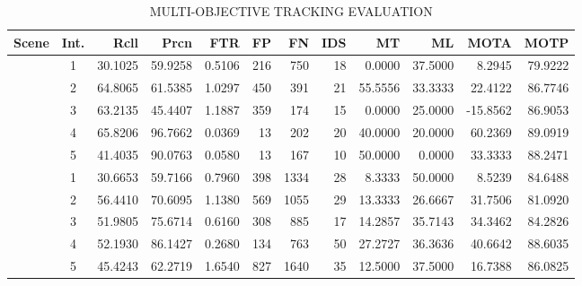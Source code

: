 \documentclass[lettersize,journal]{IEEEtran}
\begin{document}
\begin{table}[t]
	\centering
	\caption{MULTI-OBJECTIVE TRACKING EVALUATION}
	\label{tab:tracking_eval}
	\small
	\begin{tabular}{@{}l@{\hspace{1em}}c@{\hspace{0.5em}}*{10}{r}@{}}
		\toprule
		\textbf{Scene} & \textbf{Int.} & \textbf{Rcll} & \textbf{Prcn} & \textbf{FTR} & \textbf{FP} & \textbf{FN} & \textbf{IDS} & \textbf{MT} & \textbf{ML} & \textbf{MOTA} & \textbf{MOTP} \\
		\midrule
		& 1 & 30.1025 & 59.9258 & 0.5106 & 216 & 750 & 18 & 0.0000 & 37.5000 & 8.2945 & 79.9222\\
		& 2 & 64.8065 & 61.5385 & 1.0297 & 450 & 391 & 21 & 55.5556 & 33.3333 & 22.4122 & 86.7746\\
		& 3 & 63.2135 & 45.4407 & 1.1887 & 359 & 174 & 15 & 0.0000 & 25.0000 & -15.8562 & 86.9053\\
		& 4 & 65.8206 & 96.7662 & 0.0369 & 13 & 202 & 20 & 40.0000 & 20.0000 & 60.2369 & 89.0919\\
		& 5 & 41.4035 & 90.0763 & 0.0580 & 13 & 167 & 10 & 50.0000 & 0.0000 & 33.3333 & 88.2471\\
		\midrule
		& 1 & 30.6653 & 59.7166 & 0.7960 & 398 & 1334 & 28 & 8.3333 & 50.0000 & 8.5239 & 84.6488\\
		& 2 & 56.4410 & 70.6095 & 1.1380 & 569 & 1055 & 29 & 13.3333 & 26.6667 & 31.7506 & 81.0920\\
		& 3 & 51.9805 & 75.6714 & 0.6160 & 308 & 885 & 17 & 14.2857 & 35.7143 & 34.3462 & 84.2826\\
		& 4 & 52.1930 & 86.1427 & 0.2680 & 134 & 763 & 50 & 27.2727 & 36.3636 & 40.6642 & 88.6035\\
		& 5 & 45.4243 & 62.2719 & 1.6540 & 827 & 1640 & 35 & 12.5000 & 37.5000 & 16.7388 & 86.0825\\
		\bottomrule
	\end{tabular}
\end{table}
\end{document}

